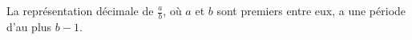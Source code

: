 La représentation décimale de $\frac{a}{b}$, où $a$ et $b$ sont premiers
entre eux, a une période d'au plus $b - 1$.
